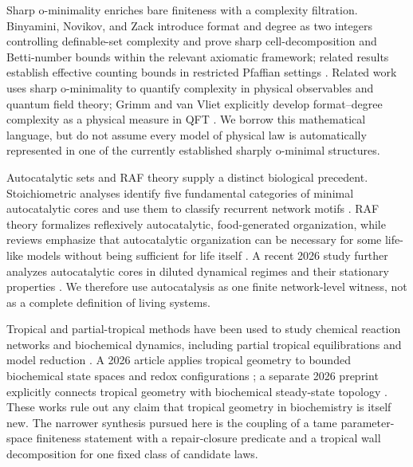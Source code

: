 \documentclass[11pt,a4paper]{article}
\theoremstyle{definition}
\theoremstyle{remark}
\begin{document}
Sharp o-minimality enriches bare finiteness with a complexity filtration. Binyamini, Novikov, and Zack introduce format and degree as two integers controlling definable-set complexity and prove sharp cell-decomposition and Betti-number bounds within the relevant axiomatic framework; related results establish effective counting bounds in restricted Pfaffian settings \cite{binyaminiNovikovZack2022,binyaminiNovikovZackWilkie2022}. Related work uses sharp o-minimality to quantify complexity in physical observables and quantum field theory; Grimm and van Vliet explicitly develop format--degree complexity as a physical measure in QFT \cite{grimmVanVliet2025}. We borrow this mathematical language, but do not assume every model of physical law is automatically represented in one of the currently established sharply o-minimal structures.

Autocatalytic sets and RAF theory supply a distinct biological precedent. Stoichiometric analyses identify five fundamental categories of minimal autocatalytic cores and use them to classify recurrent network motifs \cite{steel2013,blokhuis2020}. RAF theory formalizes reflexively autocatalytic, food-generated organization, while reviews emphasize that autocatalytic organization can be necessary for some life-like models without being sufficient for life itself \cite{hordijkSteel2017,hordijk2019}. A recent 2026 study further analyzes autocatalytic cores in diluted dynamical regimes and their stationary properties \cite{nandan2026}. We therefore use autocatalysis as one finite network-level witness, not as a complete definition of living systems.

Tropical and partial-tropical methods have been used to study chemical reaction networks and biochemical dynamics, including partial tropical equilibrations and model reduction \cite{desoeuvres2022,desoeuvres2024}. A 2026 article applies tropical geometry to bounded biochemical state spaces and redox configurations \cite{cobley2026}; a separate 2026 preprint explicitly connects tropical geometry with biochemical steady-state topology \cite{perry2026}. These works rule out any claim that tropical geometry in biochemistry is itself new. The narrower synthesis pursued here is the coupling of a tame parameter-space finiteness statement with a repair-closure predicate and a tropical wall decomposition for one fixed class of candidate laws.
\end{document}
